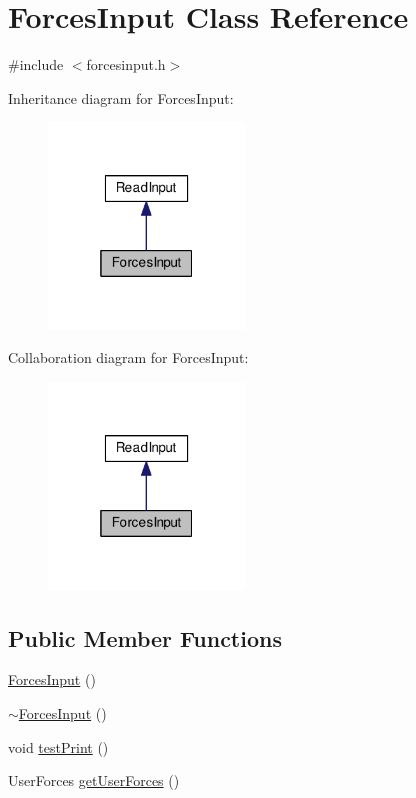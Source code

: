 \hypertarget{class_forces_input}{\section{Forces\-Input Class Reference}
\label{class_forces_input}
}


{\ttfamily \#include $<$forcesinput.\-h$>$}



Inheritance diagram for Forces\-Input\-:\nopagebreak
\begin{figure}[H]
\begin{center}
\leavevmode
\includegraphics[width=148pt]{class_forces_input__inherit__graph}
\end{center}
\end{figure}


Collaboration diagram for Forces\-Input\-:\nopagebreak
\begin{figure}[H]
\begin{center}
\leavevmode
\includegraphics[width=148pt]{class_forces_input__coll__graph}
\end{center}
\end{figure}
\subsection*{Public Member Functions}
\begin{DoxyCompactItemize}
\item 
\hyperlink{class_forces_input_ad3da9dd7decddd74ba054f3e58a848fe}{Forces\-Input} ()
\item 
\hyperlink{class_forces_input_a5891d1dd81b2e4202fe023985aa0ff1b}{$\sim$\-Forces\-Input} ()
\item 
void \hyperlink{class_forces_input_af9ca173b1f53914ba8f118ae2cc211a3}{test\-Print} ()
\item 
User\-Forces \hyperlink{class_forces_input_ab5262ae1b53c658dbaab66d338e465e2}{get\-User\-Forces} ()
\end{DoxyCompactItemize}
